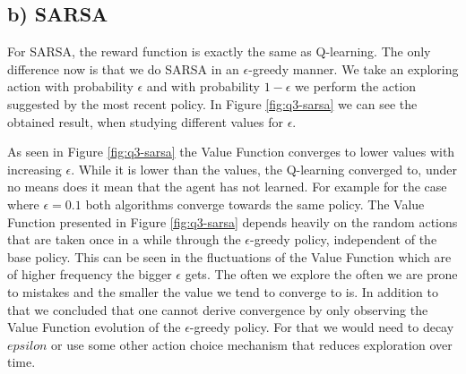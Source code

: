 \documentclass{article}
\begin{document}
\subsection{b) SARSA}
For SARSA, the reward function is exactly the same as Q-learning. The only difference now is that we do SARSA in an $\epsilon$-greedy manner. We take an exploring action with probability $\epsilon$ and with probability $1-\epsilon$ we perform the action suggested by the most recent policy. In Figure \ref{fig:q3-sarsa} we can see the obtained result, when studying different values for $\epsilon$.

As seen in Figure \ref{fig:q3-sarsa} the Value Function converges to lower values with increasing $\epsilon$. While it is lower than the values, the Q-learning converged to, under no means does it mean that the agent has not learned. For example for the case where $\epsilon = 0.1$ both algorithms converge towards the same policy. 
The Value Function presented in Figure \ref{fig:q3-sarsa} depends heavily on the random actions that are taken once in a while through the $\epsilon$-greedy policy, independent of the base policy. This can be seen in the fluctuations of the Value Function which are of higher frequency the bigger $\epsilon$ gets. The often we explore the often we are prone to mistakes and the smaller the value we tend to converge to is. 
In addition to that we concluded that one cannot derive convergence by only observing the Value Function evolution of the  $\epsilon$-greedy policy. For that we would need to decay $epsilon$ or use some other action choice mechanism that reduces exploration over time.
\end{document}
